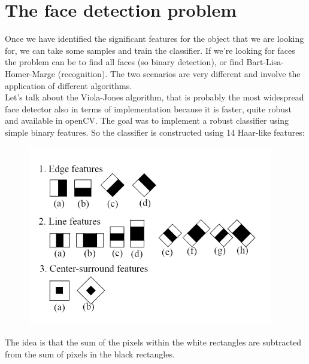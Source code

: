 \section{The face detection problem}
Once we have identified the significant features for the object that we are looking for, we can take some samples and train the classifier.
If we're looking for faces the problem can be to find all faces (so binary detection), or find Bart-Lisa-Homer-Marge (recognition).
The two scenarios are very different and involve the application of different algorithms.
\\Let's talk about the Viola-Jones algorithm, that is probably the most widespread face detector also in terms of implementation because it is faster, quite robust and available in openCV.
The goal was to implement a robust classifier using simple binary features.
So the classifier is constructed using 14 Haar-like features:
\begin{figure}[h]
    \centering
    \includegraphics[scale=0.7]{Figures/ViolaJones.png}
\end{figure}
The idea is that the sum of the pixels within the white rectangles are subtracted from the sum of pixels in the black rectangles.

